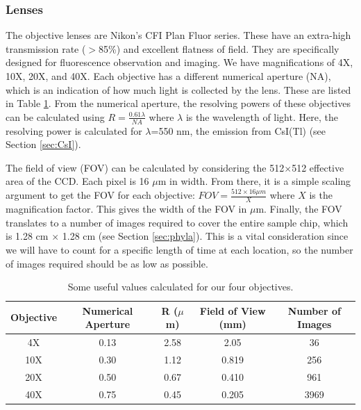 \documentclass[11pt]{article}
\begin{document}
\subsubsection{Lenses}
The objective lenses are Nikon's CFI Plan Fluor series.  These have an extra-high transmission rate ($>$85\%) and excellent flatness of field.  They are specifically designed for fluorescence observation and imaging.  We have magnifications of 4X, 10X, 20X, and 40X.  Each objective has  a different numerical aperture (NA), which is an indication of how much light is collected by the lens.  These are listed in Table \ref{tab:lens}.  From the numerical aperture, the resolving powers of these objectives can be calculated using $R = \frac{0.61\lambda}{NA}$ where $\lambda$ is the wavelength of light.  Here, the resolving power is calculated for $\lambda$=550 nm, the emission from CsI(Tl) (see Section \ref{sec:CsI}).  

The field of view (FOV) can be calculated by considering the 512$\times$512 effective area of the CCD.  Each pixel is 16 $\mu$m in width.  From there, it is a simple scaling argument to get the FOV for each objective:  $FOV = \frac{512\times16 \mu m}{X}$ where $X$ is the magnification factor.  This gives the width of the FOV in $\mu$m.  Finally, the FOV translates to a number of images required to cover the entire sample chip, which is 1.28 cm $\times$ 1.28 cm (see Section \ref{sec:phyla}).  This is a vital consideration since we will have to count for a specific length of time at each location, so the number of images required should be as low as possible.  

\begin{table}[t]\caption[]{Some useful values calculated for our four objectives.}
\begin{tabular}{|c|c|c|c|c|}
\hline
Objective & Numerical Aperture & R ($\mu$m) & Field of View (mm)  & Number of Images\\
\hline
 4X & 0.13 & 2.58  &  2.05  & 36\\\hline
 10X & 0.30 & 1.12  &  0.819 &  256 \\\hline
 20X & 0.50  & 0.67  &   0.410 & 961\\\hline
 40X & 0.75  & 0.45  & 0.205 & 3969\\\hline
 \end{tabular}
 \label{tab:lens}
\end{table}
\end{document}
